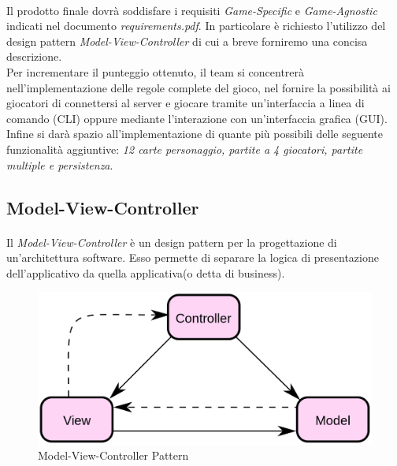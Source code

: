 \documentclass[a4paper, 12pt]{article}
\begin{document}
	\paragraph{}
	Il prodotto finale dovrà soddisfare i requisiti \emph{Game-Specific} e \emph{Game-Agnostic} indicati nel documento \emph{requirements.pdf}. In particolare è richiesto l'utilizzo del design pattern \emph{Model-View-Controller} di cui a breve forniremo una concisa descrizione.\\
	Per incrementare il punteggio ottenuto, il team si concentrerà nell'implementazione delle regole complete del gioco, nel fornire la possibilità ai giocatori di connettersi al server e giocare tramite un'interfaccia a linea di comando (CLI) oppure mediante l'interazione con un'interfaccia grafica (GUI). Infine si darà spazio all'implementazione di quante più possibili delle seguente funzionalità aggiuntive: \emph{12 carte personaggio, partite a 4 giocatori, partite multiple e persistenza}.
	
	\subsection{Model-View-Controller}
	\paragraph{}
	Il \emph{Model-View-Controller} è un design pattern per la progettazione di un'architettura software. Esso permette di separare la logica di presentazione dell'applicativo da quella applicativa(o detta di business).\\
	\begin{figure}[h!]
		\centering
		\includegraphics[scale=0.25]{mvc.png}
		\caption{Model-View-Controller Pattern}
	\end{figure}
	
\end{document}
